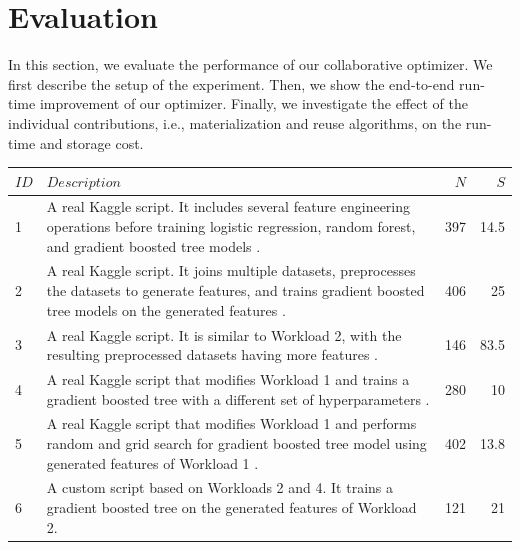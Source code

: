 \section{Evaluation} \label{sec-evaluation} 
In this section, we evaluate the performance of our collaborative optimizer.
We first describe the setup of the experiment.
Then, we show the end-to-end run-time improvement of our optimizer.
Finally, we investigate the effect of the individual contributions, i.e., materialization and reuse algorithms, on the run-time and storage cost.
\begin{table}[ht]
\begin{tabular}{lp{}rr}
\hline
\textbf{$ID$} & \textbf{$Description$}& \textbf{$N$}& \textbf{$S$}   \\
\hline
1 &  \parbox[t]{0.84\textwidth}{\linespread{0.5}\selectfont \small A real Kaggle script. It includes several feature engineering operations before training logistic regression, random forest, and gradient boosted tree models \cite{start-here-a-gentle-intro}.} & 397 & 14.5\\[0.4cm]

2 &   \parbox[t]{0.84\textwidth}{\linespread{0.5}\selectfont \small A real Kaggle script. It joins multiple datasets, preprocesses the datasets to generate features, and trains gradient boosted tree models on the generated features \cite{introduction-to-manual-feature-engineering}.} & 406 & 25\\[0.4cm]

3 &   \parbox[t]{0.84\textwidth}{\linespread{0.5}\selectfont \small A real Kaggle script. It is similar to Workload 2, with the resulting preprocessed datasets having more features \cite{introduction-to-manual-feature-engineering-p2}.} & 146 & 83.5\\[0.4cm]

4 & \parbox[t]{0.84\textwidth}{\linespread{0.5}\selectfont \small A real Kaggle script that modifies Workload 1 and trains a gradient boosted tree with a different set of hyperparameters \cite{start-here-a-gentle-intro-carlos}.} & 280 & 10\\[0.4cm]

5 & \parbox[t]{0.84\textwidth}{\linespread{0.5}\selectfont \small A real Kaggle script that modifies Workload 1 and performs random and grid search for gradient boosted tree model using generated features of Workload 1 \cite{begining-with-lightgbm-in-detail}.} & 402 & 13.8\\[0.4cm]

6 & \parbox[t]{0.84\textwidth}{\linespread{0.5}\selectfont \small A custom script based on Workloads 2 and 4. It trains a gradient boosted tree on the generated features of Workload 2.} & 121 & 21\\[0.15cm]


\end{tabular}
\end{table}
